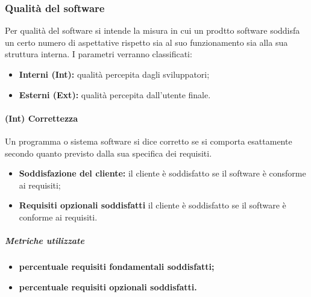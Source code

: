 \subsubsection{Qualità del software}
Per qualità del software si intende la misura in cui un prodtto software soddisfa un certo numero di aspettative rispetto sia al suo funzionamento sia alla sua struttura interna. I parametri verranno classificati:
\begin{itemize}
	\item{\textbf{Interni (Int):} qualità percepita dagli sviluppatori;}
	\item{\textbf{Esterni (Ext):} qualità percepita dall'utente finale.}
\end{itemize}
\paragraph{\textbf{(Int) Correttezza}}
Un programma o sistema software si dice corretto se si comporta esattamente secondo quanto previsto dalla sua specifica dei requisiti.
\begin{itemize}
	\item \textbf{Soddisfazione del cliente:} il cliente è soddisfatto se il software è consforme ai requisiti;
	\item \textbf{Requisiti opzionali soddisfatti} il cliente è soddisfatto se il software è conforme ai requisiti.
\end{itemize}
\subparagraph{Metriche utilizzate}
\begin{itemize}
	\item \textbf{percentuale requisiti fondamentali soddisfatti;}
	\item \textbf{percentuale requisiti opzionali soddisfatti.}
\end{itemize}
\begin{table}[!htpb]
	\centering
	\renewcommand{\arraystretch}{2} 
	\caption{TBD}
\end{table}
